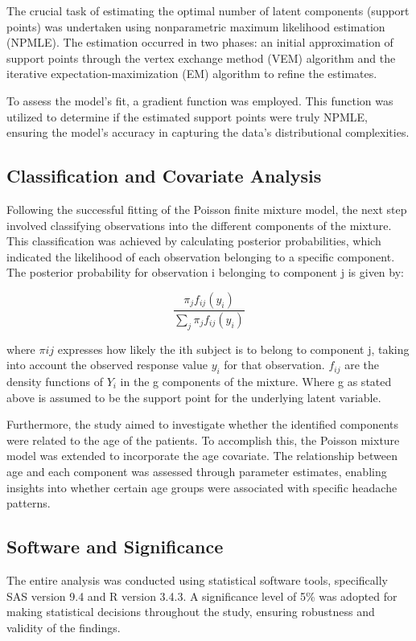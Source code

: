 \documentclass[a4paper, 12pt]{article}
\begin{document}
The crucial task of estimating the optimal number of latent components (support points) was undertaken using nonparametric maximum likelihood estimation (NPMLE). The estimation occurred in two phases: an initial approximation of support points through the vertex exchange method (VEM) algorithm and the iterative expectation-maximization (EM) algorithm to refine the estimates\cite{molenberghs2017}.

To assess the model's fit, a gradient function was employed.\cite{molenberghs2017} This function was utilized to determine if the estimated support points were truly NPMLE, ensuring the model's accuracy in capturing the data's distributional complexities.

\subsection{ Classification and Covariate Analysis}
Following the successful fitting of the Poisson finite mixture model, the next step involved classifying observations into the different components of the mixture. This classification was achieved by calculating posterior probabilities, which indicated the likelihood of each observation belonging to a specific component. The posterior probability for observation i belonging to component j is given by:

   $$\frac{\pi_jf_{ij}(y_i)}{\sum_j\pi_jf_{ij}(y_i)}$$ 
   
where $\pi{ij}$ expresses how likely the ith subject is to belong to component j, taking into account the observed response value $y_i$ for that observation. $f_{ij}$ are the density functions of $Y_i$ in the g components of the mixture. Where g as stated above is assumed to be the support point for the underlying latent variable. \cite{molenberghs2017} 

Furthermore, the study aimed to investigate whether the identified components were related to the age of the patients. To accomplish this, the Poisson mixture model was extended to incorporate the age covariate. The relationship between age and each component was assessed through parameter estimates, enabling insights into whether certain age groups were associated with specific headache patterns.

\subsection{ Software and Significance}
The entire analysis was conducted using statistical software tools, specifically SAS version 9.4 and R version 3.4.3. A significance level of 5\% was adopted for making statistical decisions throughout the study, ensuring robustness and validity of the findings.
\end{document}
